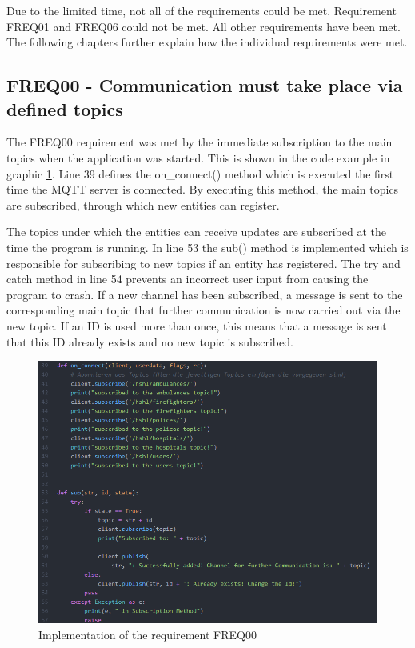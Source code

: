 Due to the limited time, not all of the requirements could be met. Requirement FREQ01 and FREQ06 could not be met. All other requirements have been met. The following chapters further explain how the individual requirements were met.


\subsection{FREQ00 - Communication must take place via defined topics}
The FREQ00 requirement was met by the immediate subscription to the main topics when the application was started. This is shown in the code example in graphic \ref{FREQ00}. Line 39 defines the on\_connect() method which is executed the first time the MQTT server is connected. By executing this method, the main topics are subscribed, through which new entities can register. 

The topics under which the entities can receive updates are subscribed at the time the program is running. In line 53 the sub() method is implemented which is responsible for subscribing to new topics if an entity has registered. The try and catch method in line 54 prevents an incorrect user input from causing the program to crash. If a new channel has been subscribed, a message is sent to the corresponding main topic that further communication is now carried out via the new topic.
If an ID is used more than once, this means that a message is sent that this ID already exists and no new topic is subscribed.

\begin{figure}
\sidecaption
\includegraphics[scale=0.4]{images/walter/code/FREQ00.png}
\caption{Implementation of the requirement FREQ00}
\label{FREQ00}
\end{figure}

